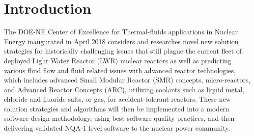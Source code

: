 \section{Introduction}
\label{s:intro}

The DOE-NE Center of Excellence for Thermal-fluids applications in Nuclear Energy \cite{shaver2019initial} inaugurated in April 2018 considers and researches novel new solution strategies for historically challenging issues that still plague the current fleet of deployed Light Water Reactor (LWR) nuclear reactors as well as predicting various fluid flow and fluid related issues with advanced reactor technologies, which includes advanced Small Modular Reactor (SMR) concepts, micro-reactors, and Advanced Reactor Concepts (ARC), utilizing coolants such as liquid metal, chloride and  fluoride salts, or gas, for accident-tolerant reactors. These new solution strategies and algorithms will then be implemented into a modern software design methodology, using best software quality practices, and then delivering validated NQA-1 level software to the nuclear power community.

